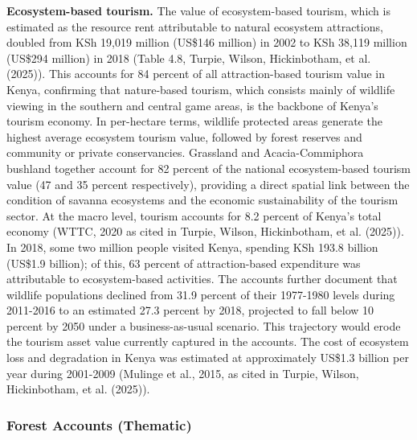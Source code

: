 \documentclass[
  letterpaper,
  DIV=11,
  numbers=noendperiod]{scrartcl}
\begin{document}
\textbf{Ecosystem-based tourism.} The value of ecosystem-based tourism,
which is estimated as the resource rent attributable to natural
ecosystem attractions, doubled from KSh 19,019 million (US\$146 million)
in 2002 to KSh 38,119 million (US\$294 million) in 2018 (Table 4.8,
Turpie, Wilson, Hickinbotham, et al. (2025)). This accounts for 84
percent of all attraction-based tourism value in Kenya, confirming that
nature-based tourism, which consists mainly of wildlife viewing in the
southern and central game areas, is the backbone of Kenya's tourism
economy. In per-hectare terms, wildlife protected areas generate the
highest average ecosystem tourism value, followed by forest reserves and
community or private conservancies. Grassland and Acacia-Commiphora
bushland together account for 82 percent of the national ecosystem-based
tourism value (47 and 35 percent respectively), providing a direct
spatial link between the condition of savanna ecosystems and the
economic sustainability of the tourism sector. At the macro level,
tourism accounts for 8.2 percent of Kenya's total economy (WTTC, 2020 as
cited in Turpie, Wilson, Hickinbotham, et al. (2025)). In 2018, some two
million people visited Kenya, spending KSh 193.8 billion (US\$1.9
billion); of this, 63 percent of attraction-based expenditure was
attributable to ecosystem-based activities. The accounts further
document that wildlife populations declined from 31.9 percent of their
1977-1980 levels during 2011-2016 to an estimated 27.3 percent by 2018,
projected to fall below 10 percent by 2050 under a business-as-usual
scenario. This trajectory would erode the tourism asset value currently
captured in the accounts. The cost of ecosystem loss and degradation in
Kenya was estimated at approximately US\$1.3 billion per year during
2001-2009 (Mulinge et al., 2015, as cited in Turpie, Wilson,
Hickinbotham, et al. (2025)).

\subsubsection{Forest Accounts
(Thematic)}\label{forest-accounts-thematic}
\end{document}
